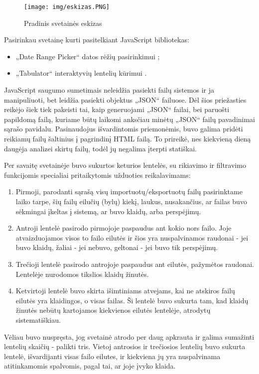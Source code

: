 \documentclass{VUMIFPSkursinis}
\begin{document}
\begin{figure}[H]
    \centering
    \texttt{[image: img/eskizas.PNG]}
    \caption{Pradinis svetainės eskizas}
    \label{img:eskizas}
\end{figure}

Pasirinkau svetainę kurti pasitelkiant JavaScript bibliotekas:
\begin{itemize}
    \item „Date Range Picker“ datos rėžių pasirinkimui \cite{daterangepicker};
    \item „Tabulator“ interaktyvių lentelių kūrimui \cite{Tabulator}.
\end{itemize}

JavaScript saugumo sumetimais neleidžia pasiekti failų sistemos ir ja manipuliuoti, bet leidžia pasiekti objektus „JSON“ failuose. Dėl šios priežasties reikėjo šiek tiek pakeisti tai, kaip generuojami „JSON“ failai, bei paruošti papildomą failą, kuriame būtų laikomi anksčiau minėtų „JSON“ failų pavadinimai sąrašo pavidalu. Pasinaudojus išvardintomis priemonėmis, buvo galima pridėti reikiamų failų šaltinius į pagrindinį HTML failą. To prireikė, nes kiekvieną dieną daugėja analizei skirtų failų, todėl jų negalima įterpti statiškai.

Per savaitę svetainėje buvo sukurtos keturios lentelės, su rikiavimo ir filtravimo funkcijomis specialiai pritaikytomis užduoties reikalavimams:
\begin{enumerate}
    \item Pirmoji, parodanti sąrašą visų importuotų/eksportuotų failų pasirinktame laiko tarpe, šių failų eilučių (bylų) kiekį, laukus, nusakančius, ar failas buvo sėkmingai įkeltas į sistemą, ar buvo klaidų, arba perspėjimų.
    \item Antroji lentelė pasirodo pirmojoje paspaudus ant kokio nors failo. Joje atvaizduojamos visos to failo eilutės ir šios yra nuspalvinamos raudonai - jei buvo klaidų, žaliai - jei nebuvo, geltonai - jei buvo tik perspėjimų.
    \item Trečioji lentelė pasirodo antrojoje paspaudus ant eilutės, pažymėtos raudonai. Lentelėje nurodomos tikslios klaidų žinutės.
    \item Ketvirtoji lentelė buvo skirta išimtiniams atvejams, kai ne atskiros failų eilutės yra klaidingos, o visas failas. Ši lentelė buvo sukurta tam, kad klaidų žinutės nebūtų kartojamos kiekvienos eilutės lentelėje, atrodytų sistematiškiau.
\end{enumerate}

Vėliau buvo nuspręsta, jog svetainė atrodo per daug apkrauta ir galima sumažinti lentelių skaičių - palikti tris. Vietoj antrosios ir trečiosios lentelių buvo sukurta lentelė, išvardijanti visas failo eilutes, ir kiekviena jų yra nuspalvinama atitinkamomis spalvomis, pagal tai, ar joje įvyko klaida.
\end{document}
